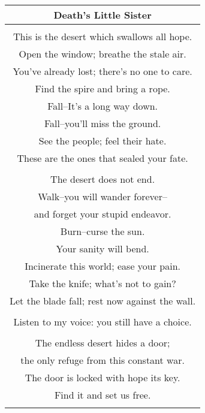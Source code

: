 \documentclass{article}
\begin{document}
\begin{center}
\begin{tabular}{c}
\textbf{Death's Little Sister} \\ \hline
\\
This is the desert which swallows all hope. \\
Open the window; breathe the stale air. \\
You've already lost; there's no one to care. \\
Find the spire and bring a rope. \\
Fall--It's a long way down. \\
Fall--you'll miss the ground. \\
See the people; feel their hate. \\
These are the ones that sealed your fate. \\
\\
The desert does not end. \\
Walk--you will wander forever-- \\
and forget your stupid endeavor. \\
Burn--curse the sun. \\
Your sanity will bend. \\
Incinerate this world; ease your pain. \\
Take the knife; what's not to gain? \\
Let the blade fall; rest now against the wall. \\
\\
Listen to my voice: you still have a choice. \\
\\
The endless desert hides a door; \\
the only refuge from this constant war. \\
The door is locked with hope its key. \\
Find it and set us free. \\
\\
\end{tabular}
\end{center}
\end{document}
